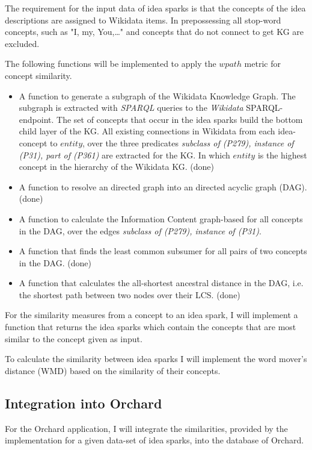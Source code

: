 \documentclass[pdftex,a4paper,12pt]{scrartcl}
\theoremstyle{definition}
\begin{document}
    The requirement for the input data of idea sparks is that the concepts of the idea descriptions are assigned to Wikidata items. In prepossessing all stop-word concepts, such as "I, my, You,\dots" and concepts that do not connect to get KG are excluded.
    
    The following functions will be implemented to apply the $wpath$ metric for concept similarity.
    \begin{itemize}
        \item A function to generate a subgraph of the Wikidata Knowledge Graph.
        The subgraph is extracted with \textit{SPARQL} queries to the \textit{Wikidata} SPARQL-endpoint. The set of concepts that occur in the idea sparks build the bottom child layer of the KG. All existing connections in Wikidata from each idea-concept to $entity$, over the three predicates \textit{subclass of (P279), instance of (P31), part of (P361)} are extracted for the KG. In which $entity$ is the highest concept in the hierarchy of the Wikidata KG. (done)
        \item A function to resolve an directed graph into an directed acyclic graph (DAG). (done)
        \item A function to calculate the Information Content graph-based for all concepts in the DAG, over the edges \textit{subclass of (P279), instance of (P31)}. 
        \item A function that finds the least common subsumer for all pairs of two concepts in the DAG. (done)
        \item A function that calculates the all-shortest ancestral distance in the DAG, i.e. the shortest path between two nodes over their LCS. (done)
    \end{itemize}
    
    For the similarity measures from a concept to an idea spark, I will implement a function that returns the idea sparks which contain the concepts that are most similar to the concept given as input. 
    
    To calculate the similarity between idea sparks I will implement the word mover's distance (WMD) \citep{kusner_word_nodate} based on the similarity of their concepts. 
    
    \subsection{Integration into Orchard}
    
    For the Orchard application, I will integrate the similarities, provided by the implementation for a given data-set of idea sparks, into the database of Orchard. 
\end{document}
